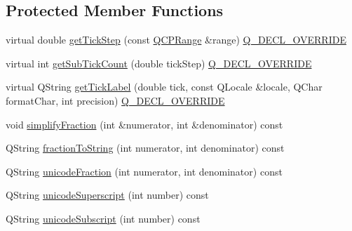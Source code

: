 \subsection*{Protected Member Functions}
\begin{DoxyCompactItemize}
\item 
virtual double \mbox{\hyperlink{class_q_c_p_axis_ticker_pi_a55301f0072983bd2d7c131a24e1779e7}{get\+Tick\+Step}} (const \mbox{\hyperlink{class_q_c_p_range}{Q\+C\+P\+Range}} \&range) \mbox{\hyperlink{qcustomplot_8h_a42cc5eaeb25b85f8b52d2a4b94c56f55}{Q\+\_\+\+D\+E\+C\+L\+\_\+\+O\+V\+E\+R\+R\+I\+DE}}
\item 
virtual int \mbox{\hyperlink{class_q_c_p_axis_ticker_pi_a56c90f870da97c8670cfae4d04ff3ac7}{get\+Sub\+Tick\+Count}} (double tick\+Step) \mbox{\hyperlink{qcustomplot_8h_a42cc5eaeb25b85f8b52d2a4b94c56f55}{Q\+\_\+\+D\+E\+C\+L\+\_\+\+O\+V\+E\+R\+R\+I\+DE}}
\item 
virtual Q\+String \mbox{\hyperlink{class_q_c_p_axis_ticker_pi_a9a087d931d4344b8a91d5cecceff7109}{get\+Tick\+Label}} (double tick, const Q\+Locale \&locale, Q\+Char format\+Char, int precision) \mbox{\hyperlink{qcustomplot_8h_a42cc5eaeb25b85f8b52d2a4b94c56f55}{Q\+\_\+\+D\+E\+C\+L\+\_\+\+O\+V\+E\+R\+R\+I\+DE}}
\item 
void \mbox{\hyperlink{class_q_c_p_axis_ticker_pi_a0e30609aed5025d331cb61671f0115d0}{simplify\+Fraction}} (int \&numerator, int \&denominator) const
\item 
Q\+String \mbox{\hyperlink{class_q_c_p_axis_ticker_pi_afb59d434358173eb5b58e41255bea904}{fraction\+To\+String}} (int numerator, int denominator) const
\item 
Q\+String \mbox{\hyperlink{class_q_c_p_axis_ticker_pi_ade6f7e49238e986e9aed74178a78d8d3}{unicode\+Fraction}} (int numerator, int denominator) const
\item 
Q\+String \mbox{\hyperlink{class_q_c_p_axis_ticker_pi_a34798972670b3760d649ccfe0d0ee9a5}{unicode\+Superscript}} (int number) const
\item 
Q\+String \mbox{\hyperlink{class_q_c_p_axis_ticker_pi_a5b3bb340adb888a30a96225e1ca23c7a}{unicode\+Subscript}} (int number) const
\end{DoxyCompactItemize}
